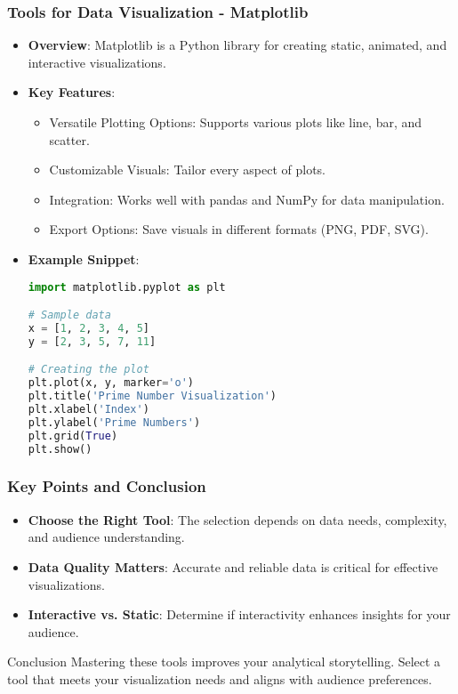 \documentclass{beamer}
\begin{document}
\begin{frame}[fragile]
    \frametitle{Tools for Data Visualization - Matplotlib}
    \begin{itemize}
        \item \textbf{Overview}: 
        Matplotlib is a Python library for creating static, animated, and interactive visualizations.
        
        \item \textbf{Key Features}:
        \begin{itemize}
            \item Versatile Plotting Options: Supports various plots like line, bar, and scatter.
            \item Customizable Visuals: Tailor every aspect of plots.
            \item Integration: Works well with pandas and NumPy for data manipulation.
            \item Export Options: Save visuals in different formats (PNG, PDF, SVG).
        \end{itemize}
        
        \item \textbf{Example Snippet}:
        \begin{lstlisting}[language=Python]
import matplotlib.pyplot as plt

# Sample data
x = [1, 2, 3, 4, 5]
y = [2, 3, 5, 7, 11]

# Creating the plot
plt.plot(x, y, marker='o')
plt.title('Prime Number Visualization')
plt.xlabel('Index')
plt.ylabel('Prime Numbers')
plt.grid(True)
plt.show()
        \end{lstlisting}
    \end{itemize}
\end{frame}

\begin{frame}[fragile]
    \frametitle{Key Points and Conclusion}
    \begin{itemize}
        \item \textbf{Choose the Right Tool}: 
        The selection depends on data needs, complexity, and audience understanding.
        
        \item \textbf{Data Quality Matters}: 
        Accurate and reliable data is critical for effective visualizations.
        
        \item \textbf{Interactive vs. Static}: 
        Determine if interactivity enhances insights for your audience.
    \end{itemize}

    \begin{block}{Conclusion}
        Mastering these tools improves your analytical storytelling. Select a tool that meets your visualization needs and aligns with audience preferences.
    \end{block}
\end{frame}
\end{document}
